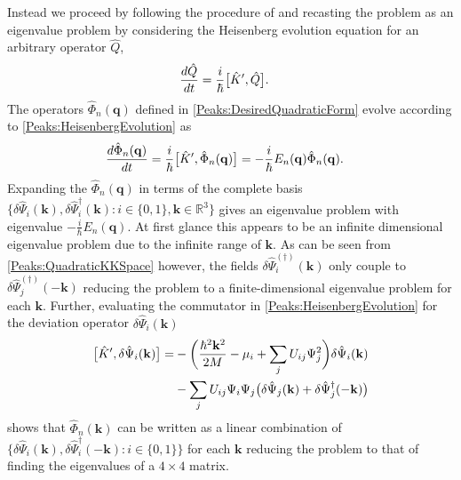 Instead we proceed by following the procedure of \citep{Leonhardt:2003} and recasting the problem as an eigenvalue problem by considering the Heisenberg evolution equation for an arbitrary operator $\hat{Q}$,
\begin{align}
    \frac{d \hat{Q}}{dt} &= \frac{i}{\hbar}\comm{\hat{K}', \hat{Q}}. \label{Peaks:HeisenbergEvolution}
\end{align}
The operators $\hat{\Phi}_n(\mathbf{q})$ defined in \eqref{Peaks:DesiredQuadraticForm} evolve according to \eqref{Peaks:HeisenbergEvolution} as
\begin{align}
    \frac{d \hat{\Phi}_n(\mathbf{q})}{dt} &= \frac{i}{\hbar}\big[\hat{K}', \hat{\Phi}_n(\mathbf{q})\big] = - \frac{i}{\hbar} E_n(\mathbf{q}) \hat{\Phi}_n(\mathbf{q}).
\end{align}
Expanding the $\hat{\Phi}_n(\mathbf{q})$ in terms of the complete basis $\big\{\delta\hat{\Psi}_i(\mathbf{k}), \delta\hat{\Psi}_i^\dagger(\mathbf{k}): i \in \{0, 1\}, \mathbf{k} \in \mathbb{R}^3\big\}$ gives an eigenvalue problem with eigenvalue $-\frac{i}{\hbar}E_n(\mathbf{q})$.  At first glance this appears to be an infinite dimensional eigenvalue problem due to the infinite range of $\mathbf{k}$. As can be seen from \eqref{Peaks:QuadraticKKSpace} however, the fields $\delta\hat{\Psi}_i^{(\dagger)}(\mathbf{k})$ only couple to  $\delta\hat{\Psi}_j^{(\dagger)}(-\mathbf{k})$ reducing the problem to a finite-dimensional eigenvalue problem for each $\mathbf{k}$. Further, evaluating the commutator in \eqref{Peaks:HeisenbergEvolution} for the deviation operator $\delta\hat{\Psi}_i(\mathbf{k})$
\begin{align}
    \begin{split}
        \big[\hat{K}', \delta\hat{\Psi}_i(\mathbf{k})\big] =& -\bigg(\frac{\hbar^2 \mathbf{k}^2}{2M} - \mu_i + \sum_j U_{ij} \Psi_j^2\bigg) \delta\hat{\Psi}_i(\mathbf{k})\\
        &- \sum_j U_{ij} \Psi_i \Psi_j \big(\delta\hat{\Psi}_j(\mathbf{k}) + \delta\hat{\Psi}_j^\dagger(-\mathbf{k})\big)
    \end{split}
\end{align}
shows that $\hat{\Phi}_n(\mathbf{k})$ can be written as a linear combination of $\big\{\delta\hat{\Psi}_i(\mathbf{k}), \delta\hat{\Psi}_i^\dagger(-\mathbf{k}) : i \in \{0, 1\}\big\}$ for each $\mathbf{k}$ reducing the problem to that of finding the eigenvalues of a $4\times 4$ matrix.

